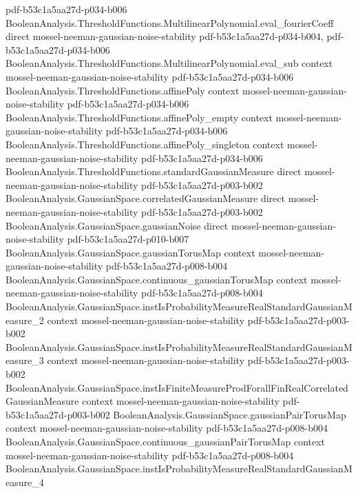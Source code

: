 \begin{theorem}
  {pdf-b53c1a5aa27d-p034-b006}
\proofstep
  {BooleanAnalysis.ThresholdFunctions.MultilinearPolynomial.eval_fourierCoeff}
  {direct}
  {mossel-neeman-gaussian-noise-stability}
  {pdf-b53c1a5aa27d-p034-b004,
    pdf-b53c1a5aa27d-p034-b006}
\proofstep
  {BooleanAnalysis.ThresholdFunctions.MultilinearPolynomial.eval_sub}
  {context}
  {mossel-neeman-gaussian-noise-stability}
  {pdf-b53c1a5aa27d-p034-b006}
\proofstep
  {BooleanAnalysis.ThresholdFunctions.affinePoly}
  {context}
  {mossel-neeman-gaussian-noise-stability}
  {pdf-b53c1a5aa27d-p034-b006}
\proofstep
  {BooleanAnalysis.ThresholdFunctions.affinePoly_empty}
  {context}
  {mossel-neeman-gaussian-noise-stability}
  {pdf-b53c1a5aa27d-p034-b006}
\proofstep
  {BooleanAnalysis.ThresholdFunctions.affinePoly_singleton}
  {context}
  {mossel-neeman-gaussian-noise-stability}
  {pdf-b53c1a5aa27d-p034-b006}
\proofstep
  {BooleanAnalysis.ThresholdFunctions.standardGaussianMeasure}
  {direct}
  {mossel-neeman-gaussian-noise-stability}
  {pdf-b53c1a5aa27d-p003-b002}
\proofstep
  {BooleanAnalysis.GaussianSpace.correlatedGaussianMeasure}
  {direct}
  {mossel-neeman-gaussian-noise-stability}
  {pdf-b53c1a5aa27d-p003-b002}
\proofstep
  {BooleanAnalysis.GaussianSpace.gaussianNoise}
  {direct}
  {mossel-neeman-gaussian-noise-stability}
  {pdf-b53c1a5aa27d-p010-b007}
\proofstep
  {BooleanAnalysis.GaussianSpace.gaussianTorusMap}
  {context}
  {mossel-neeman-gaussian-noise-stability}
  {pdf-b53c1a5aa27d-p008-b004}
\proofstep
  {BooleanAnalysis.GaussianSpace.continuous_gaussianTorusMap}
  {context}
  {mossel-neeman-gaussian-noise-stability}
  {pdf-b53c1a5aa27d-p008-b004}
\proofstep
  {BooleanAnalysis.GaussianSpace.instIsProbabilityMeasureRealStandardGaussianMeasure_2}
  {context}
  {mossel-neeman-gaussian-noise-stability}
  {pdf-b53c1a5aa27d-p003-b002}
\proofstep
  {BooleanAnalysis.GaussianSpace.instIsProbabilityMeasureRealStandardGaussianMeasure_3}
  {context}
  {mossel-neeman-gaussian-noise-stability}
  {pdf-b53c1a5aa27d-p003-b002}
\proofstep
  {BooleanAnalysis.GaussianSpace.instIsFiniteMeasureProdForallFinRealCorrelatedGaussianMeasure}
  {context}
  {mossel-neeman-gaussian-noise-stability}
  {pdf-b53c1a5aa27d-p003-b002}
\proofstep
  {BooleanAnalysis.GaussianSpace.gaussianPairTorusMap}
  {context}
  {mossel-neeman-gaussian-noise-stability}
  {pdf-b53c1a5aa27d-p008-b004}
\proofstep
  {BooleanAnalysis.GaussianSpace.continuous_gaussianPairTorusMap}
  {context}
  {mossel-neeman-gaussian-noise-stability}
  {pdf-b53c1a5aa27d-p008-b004}
\proofstep
  {BooleanAnalysis.GaussianSpace.instIsProbabilityMeasureRealStandardGaussianMeasure_4}

\end{theorem}
